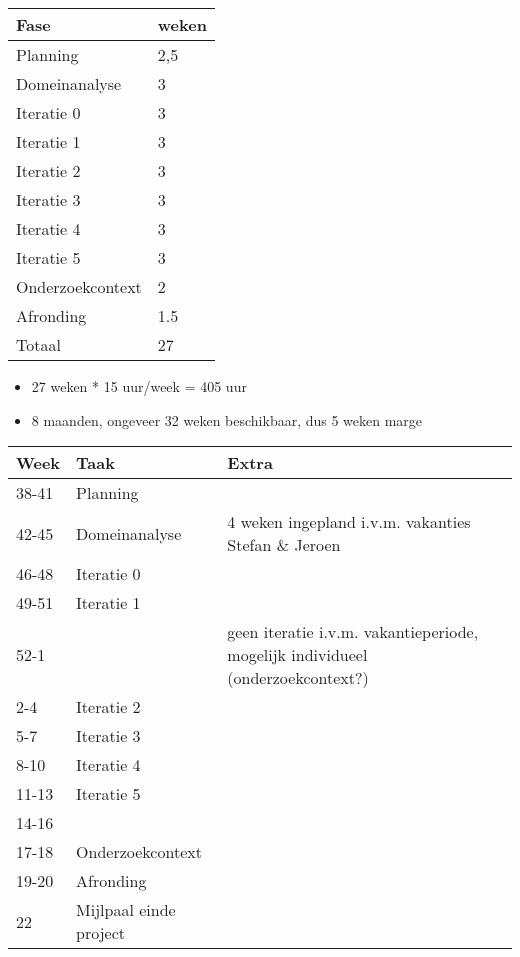 


\begin{tabular}{ll}\hline
{\bf Fase}    & {\bf weken}\\\hline
Planning             & 2,5 \\
\hline
Domeinanalyse        & 3 \\
Iteratie 0           & 3 \\
\hline
Iteratie 1           & 3 \\
Iteratie 2           & 3 \\
Iteratie 3           & 3 \\
Iteratie 4           & 3 \\
Iteratie 5           & 3 \\
\hline
Onderzoekcontext     &	2 \\
\hline
Afronding	     & 1.5 \\
\hline
Totaal               & 27 \\
\end{tabular}


\begin{itemize}
 \item 27 weken * 15 uur/week = 405 uur
 \item 8 maanden, ongeveer 32 weken beschikbaar, dus 5 weken marge
\end{itemize}



\begin{tabular}{lll}\hline
{\bf Week}    & {\bf Taak}  & {\bf Extra}\\\hline
38-41         & Planning    \\
42-45         & Domeinanalyse & 4 weken ingepland i.v.m. vakanties Stefan \& Jeroen \\
46-48         & Iteratie 0    \\
49-51         & Iteratie 1    \\
52-1          &               & geen iteratie i.v.m. vakantieperiode, mogelijk individueel (onderzoekcontext?) \\
2-4           & Iteratie 2    \\
5-7           & Iteratie 3    \\
8-10          & Iteratie 4    \\
11-13         & Iteratie 5    \\
14-16         &               \\
17-18         & Onderzoekcontext \\
19-20         & Afronding     \\
22            & Mijlpaal einde project

\end{tabular}




